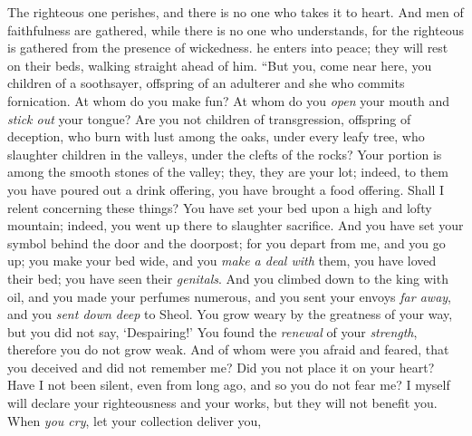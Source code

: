 \begin{biblechapter} %
 The righteous one perishes, and there is no one who takes it to heart. 
And men of faithfulness are gathered, while there is no one who understands, 
for the righteous is gathered from the presence of wickedness.
\verse he enters into peace; 
they will rest on their beds, 
walking straight ahead of him.
\verse “But you, come near here, you children of a soothsayer, 
offspring of an adulterer and she who commits fornication.
\verse At whom do you make fun? 
At whom do you \textit{open} your mouth and \textit{stick out} your tongue? 
Are you not children of transgression, 
offspring of deception,
\verse who burn with lust among the oaks, 
under every leafy tree, 
who slaughter children in the valleys, 
under the clefts of the rocks?
\verse Your portion is among the smooth stones of the valley; 
they, they are your lot; 
indeed, to them you have poured out a drink offering, 
you have brought a food offering. Shall I relent concerning these things?
\verse You have set your bed upon a high and lofty mountain; 
indeed, you went up there to slaughter sacrifice.
\verse And you have set your symbol behind the door and the doorpost; 
for you depart from me, and you go up; 
you make your bed wide, and you \textit{make a deal with} them, 
you have loved their bed; you have seen their \textit{genitals}.
\verse And you climbed down to the king with oil, 
and you made your perfumes numerous, 
and you sent your envoys \textit{far away}, 
and you \textit{sent down deep} to Sheol.
\verse You grow weary by the greatness of your way, 
but you did not say, ‘Despairing!’ 
You found the \textit{renewal} of your \textit{strength}, 
therefore you do not grow weak.
\verse And of whom were you afraid and feared, that you deceived 
and did not remember me? 
Did you not place it on your heart? 
Have I not been silent, even from long ago, 
and so you do not fear me?
\verse I myself will declare your righteousness and your works, 
but they will not benefit you.
\verse When \textit{you cry}, let your collection deliver you, 

\end{biblechapter}

